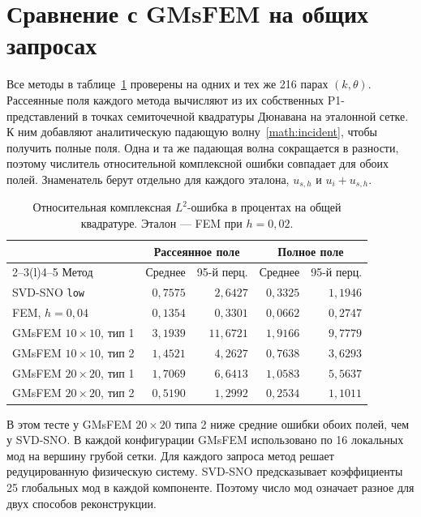 \clearpage
\section{Сравнение с GMsFEM на общих запросах}

Все методы в таблице~\ref{exp:comparison} проверены на одних и тех же
216 парах $(k,\theta)$. Рассеянные поля каждого метода вычисляют из
их собственных P1-представлений в точках семиточечной квадратуры
Дюнавана на эталонной сетке. К ним добавляют аналитическую падающую
волну~\eqref{math:incident}, чтобы получить полные поля.
Одна и та же падающая волна сокращается в разности, поэтому числитель
относительной комплексной ошибки совпадает для обоих полей.
Знаменатель берут отдельно для каждого эталона, $u_{s,h}$ и $u_i+u_{s,h}$.

\begin{table}[htbp]
\centering
\caption{Относительная комплексная $L^2$-ошибка в процентах
на общей квадратуре. Эталон --- FEM при $h=0{,}02$.}
\label{exp:comparison}
\begin{tabular}{@{}lrrrr@{}}
\toprule
 & \multicolumn{2}{c}{Рассеянное поле} & \multicolumn{2}{c}{Полное поле}\\
\cmidrule(lr){2--3}\cmidrule(l){4--5}
Метод & Среднее & 95-й перц. & Среднее & 95-й перц.\\
\midrule
SVD-SNO \texttt{low} & $0{,}7575$ & $2{,}6427$ & $0{,}3325$ & $1{,}1946$\\
FEM, $h=0{,}04$ & $0{,}1354$ & $0{,}3301$ & $0{,}0662$ & $0{,}2747$\\
GMsFEM $10\times10$, тип 1 & $3{,}1939$ & $11{,}6721$ & $1{,}9166$ & $9{,}7779$\\
GMsFEM $10\times10$, тип 2 & $1{,}4521$ & $4{,}2627$ & $0{,}7638$ & $3{,}6293$\\
GMsFEM $20\times20$, тип 1 & $1{,}7069$ & $6{,}6413$ & $1{,}0583$ & $5{,}5637$\\
GMsFEM $20\times20$, тип 2 & $0{,}5190$ & $1{,}2992$ & $0{,}2534$ & $1{,}1011$\\
\bottomrule
\end{tabular}
\end{table}

В этом тесте у GMsFEM $20\times20$ типа 2 ниже средние ошибки обоих
полей, чем у SVD-SNO. В каждой конфигурации GMsFEM использовано
по 16 локальных мод на вершину грубой сетки. Для каждого запроса метод
решает редуцированную физическую систему. SVD-SNO предсказывает
коэффициенты 25 глобальных мод в каждой компоненте. Поэтому число мод
означает разное для двух способов реконструкции.

